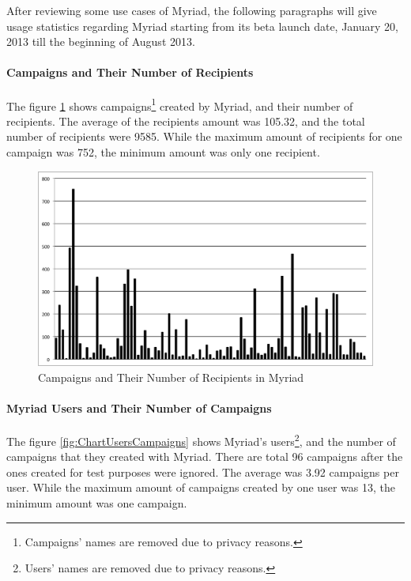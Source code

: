 After reviewing some use cases of Myriad, the following paragraphs will give usage statistics regarding Myriad starting from its beta launch date, January 20, 2013 till the beginning of August 2013.

\paragraph{Campaigns and Their Number of Recipients} The figure \ref{fig:ChartCampaignsRecipients} shows campaigns\footnote{Campaigns' names are removed due to privacy reasons.} created by Myriad, and their number of recipients. The average of the recipients amount was 105.32, and the total number of recipients were 9585. While the maximum amount of recipients for one campaign was 752, the minimum amount was only one recipient.

\begin{figure}[htbp]
	\centering
	\includegraphics[width=1.00\textwidth]{imgs/ChartCampaignsRecipients.png}
	\caption[Campaigns and Their Number of Recipients in Myriad]{Campaigns and Their Number of Recipients in Myriad}
	\label{fig:ChartCampaignsRecipients}
\end{figure}

\paragraph{Myriad Users and Their Number of Campaigns} The figure \ref{fig:ChartUsersCampaigns} shows Myriad's users\footnote{Users' names are removed due to privacy reasons.}, and the number of campaigns that they created with Myriad. There are total 96 campaigns after the ones created for test purposes were ignored. The average was 3.92 campaigns per user. While the maximum amount of campaigns created by one user was 13, the minimum amount was one campaign.

